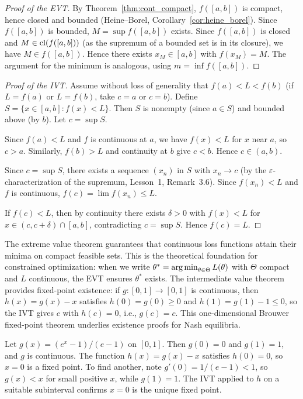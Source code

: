\documentclass[11pt,a4paper]{article}
\begin{document}
\begin{proof}[Proof of the EVT]
By Theorem~\ref{thm:cont_compact}, $f([a,b])$ is compact, hence closed
and bounded (Heine--Borel, Corollary~\ref{cor:heine_borel}). Since
$f([a,b])$ is bounded, $M = \sup f([a,b])$ exists. Since $f([a,b])$ is
closed and $M \in \operatorname{cl}(f([a,b]))$ (as the supremum of a bounded set is in
its closure), we have $M \in f([a,b])$. Hence there exists $x_M \in [a,b]$
with $f(x_M) = M$. The argument for the minimum is analogous, using
$m = \inf f([a,b])$.
\end{proof}

\begin{proof}[Proof of the IVT]
Assume without loss of generality that $f(a) < L < f(b)$ (if $L = f(a)$
or $L = f(b)$, take $c = a$ or $c = b$). Define
$S = \{x \in [a, b] : f(x) < L\}$. Then $S$ is nonempty (since
$a \in S$) and bounded above (by $b$). Let $c = \sup S$.

Since $f(a) < L$ and $f$ is continuous at $a$, we have $f(x) < L$ for
$x$ near $a$, so $c > a$. Similarly, $f(b) > L$ and continuity at $b$
give $c < b$. Hence $c \in (a, b)$.

Since $c = \sup S$, there exists a sequence $(x_n)$ in $S$ with
$x_n \to c$ (by the $\varepsilon$-characterization of the supremum,
Lesson~1, Remark~3.6). Since $f(x_n) < L$ and $f$ is continuous,
$f(c) = \lim f(x_n) \le L$.

If $f(c) < L$, then by continuity there exists $\delta > 0$ with
$f(x) < L$ for $x \in (c, c + \delta) \cap [a, b]$, contradicting
$c = \sup S$. Hence $f(c) = L$.
\end{proof}

\begin{rlconnection}[title={EVT in optimization and the IVT in root-finding}]
The extreme value theorem guarantees that continuous loss functions attain
their minima on compact feasible sets. This is the theoretical foundation
for constrained optimization: when we write
$\theta^* = \operatorname{arg\,min}_{\theta \in \Theta} L(\theta)$ with $\Theta$ compact
and $L$ continuous, the EVT ensures $\theta^*$ exists. The intermediate
value theorem provides fixed-point existence: if $g \colon [0,1] \to [0,1]$
is continuous, then $h(x) = g(x) - x$ satisfies $h(0) = g(0) \ge 0$ and
$h(1) = g(1) - 1 \le 0$, so the IVT gives $c$ with $h(c) = 0$, i.e.,
$g(c) = c$. This one-dimensional Brouwer fixed-point theorem underlies
existence proofs for Nash equilibria.
\end{rlconnection}

\begin{example}
\label{ex:ivt_fixed_point}
Let $g(x) = (e^x - 1)/(e - 1)$ on $[0, 1]$. Then $g(0) = 0$ and
$g(1) = 1$, and $g$ is continuous. The function $h(x) = g(x) - x$
satisfies $h(0) = 0$, so $x = 0$ is a fixed point. To find another,
note $g'(0) = 1/(e-1) < 1$, so $g(x) < x$ for small positive $x$, while
$g(1) = 1$. The IVT applied to $h$ on a suitable subinterval confirms
$x = 0$ is the unique fixed point.
\end{example}
\end{document}
